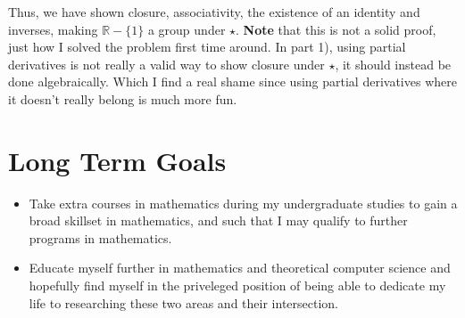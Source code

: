 \documentclass{article}
\begin{document}
Thus, we have shown closure, associativity, the existence of an identity and inverses, making \( \mathbb{R} - \{1\}\) a group under \( \star \).
\textbf{Note} that this is not a solid proof, just how I solved the problem 
first time around. 
In part 1), using partial derivatives is not really a valid way
to show closure under \(\star\), it should instead be done algebraically. 
Which I find a real shame since using partial derivatives where it doesn't 
really belong is much more fun.

\break
\section{Long Term Goals}
\begin{itemize}
  \item Take extra courses in mathematics during my undergraduate studies to gain a broad skillset in mathematics, and such that I may qualify to further programs in mathematics. 
  \item Educate myself further in mathematics and theoretical computer science and hopefully find myself in the priveleged position of being able to dedicate my life to researching these two areas and their intersection.
\end{itemize}
\end{document}

